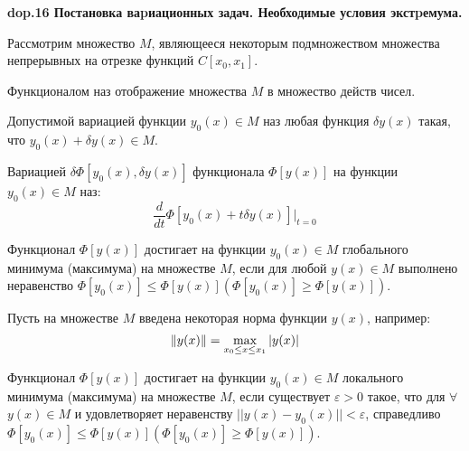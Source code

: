 \textbf{\LARGE dop.16 Постановка ваpиационных задач. Необходимые условия экстpемума.}

Рассмотрим множество $M$, являющееся некоторым подмножеством
множества непрерывных на отрезке функций $C[x_0, x_1]$.

\begin{definition}
    Функционалом наз отображение множества $M$ в множество действ чисел.
\end{definition}

\begin{definition}
    Допустимой вариацией функции $y_0(x) \in M$ наз любая функция $\delta y(x)$ такая, что $y_0(x) + \delta y(x) \in M$.
\end{definition}

\begin{definition}
    Вариацией $\delta\Phi[y_0(x), \delta y(x)]$ функционала
    $\Phi[y(x)]$ на функции $y_0(x) \in M$ наз: $$\frac{d}{dt}\Phi[y_0(x)+t\delta y(x)]\Big|_{t=0}$$
\end{definition}

\begin{definition}
    Функционал $\Phi[y(x)]$ достигает на функции
    $y_0(x) \in M$ глобального минимума (максимума) на множестве $M$, если для любой $y(x) \in M$ выполнено неравенство $\Phi[y_0(x)]\leq\Phi[y(x)]  (\Phi[y_0(x)]\geq\Phi[y(x)])$.
\end{definition}

Пусть на множестве $M$ введена некоторая норма функции $y(x)$, например:
$$\|y(x)\|=\displaystyle\max_{x_0\leq x \leq x_1} |y(x)|$$

\begin{definition}
    Функционал $\Phi[y(x)]$ достигает на функции
    $y_0(x)\in M$ локального минимума (максимума) на множестве $M$, если
    существует $\varepsilon > 0$ такое, что для $\forall$ $y(x) \in M$ и удовлетворяет неравенству $||y(x) - y_0(x)|| < \varepsilon$, справедливо $\Phi[y_0(x)] \leq \Phi[y(x)] (\Phi[y_0(x)] \geq \Phi[y(x)])$.
\end{definition}

